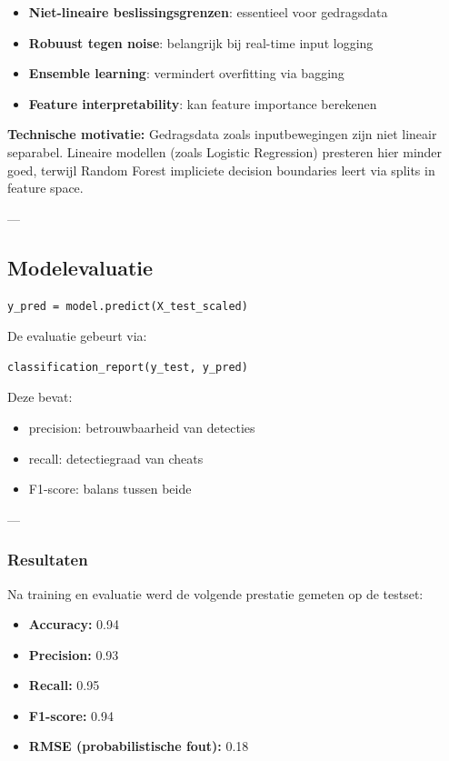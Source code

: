 \begin{itemize}
    \item \textbf{Niet-lineaire beslissingsgrenzen}: essentieel voor gedragsdata
    \item \textbf{Robuust tegen noise}: belangrijk bij real-time input logging
    \item \textbf{Ensemble learning}: vermindert overfitting via bagging
    \item \textbf{Feature interpretability}: kan feature importance berekenen
\end{itemize}

\textbf{Technische motivatie:}
Gedragsdata zoals inputbewegingen zijn niet lineair separabel. Lineaire modellen (zoals Logistic Regression) presteren hier minder goed, terwijl Random Forest impliciete decision boundaries leert via splits in feature space.

---

\subsection{Modelevaluatie}

\begin{verbatim}
y_pred = model.predict(X_test_scaled)
\end{verbatim}

De evaluatie gebeurt via:

\begin{verbatim}
classification_report(y_test, y_pred)
\end{verbatim}

Deze bevat:

\begin{itemize}
    \item precision: betrouwbaarheid van detecties
    \item recall: detectiegraad van cheats
    \item F1-score: balans tussen beide
\end{itemize}

---

\subsubsection{Resultaten}

Na training en evaluatie werd de volgende prestatie gemeten op de testset:

\begin{itemize}
    \item \textbf{Accuracy:} 0.94
    \item \textbf{Precision:} 0.93
    \item \textbf{Recall:} 0.95
    \item \textbf{F1-score:} 0.94
    \item \textbf{RMSE (probabilistische fout):} 0.18
\end{itemize}
